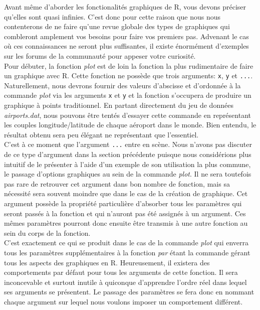 Avant même d'aborder les fonctionalités graphiques de R, vous devons préciser qu'elles sont quasi infinies. C'est donc pour cette raison que nous nous contenterons de ne faire qu'une revue globale des types de graphiques qui combleront amplement vos besoins pour faire vos premiers pas. Advenant le cas où ces connaissances ne seront plus suffisantes, il existe énormément d'exemples sur les forums de la communauté pour appeser votre curiosité. \\

\noindent
Pour débuter, la fonction \emph{plot} est de loin la fonction la plus rudimentaire de faire un graphique avec R. Cette fonction ne possède que trois arguments: \texttt{x}, \texttt{y} et \texttt{...}. Naturellement, nous devrons fournir des valeurs d'abscisse et d'ordonnée à la commande \emph{plot} via les arguments \texttt{x} et \texttt{y} et la fonction s'occupera de produire un graphique à points traditionnel. En partant directement du jeu de données \emph{airports.dat}, nous pouvons être tentés d'essayer cette commande en représentant les couples longitude/latitude de chaque aéroport dans le monde. Bien entendu, le résultat obtenu sera peu élégant ne représentant que l'essentiel. \\

\noindent
C'est à ce moment que l'argument \texttt{...} entre en scène. Nous n'avons pas discuter de ce type d'argument dans la section précédente puisque nous considérions plus intuitif de le présenter à l'aide d'un exemple de son utilisation la plus commune, le passage d'options graphiques au sein de la commande \emph{plot}. Il ne sera toutefois pas rare de retrouver cet argument dans bon nombre de fonction, mais sa nécessité sera souvent moindre que dans le cas de la création de graphique. Cet argument possède la propriété particulière d'absorber tous les paramètres qui seront passés à la fonction et qui n'auront pas été assignés à un argument. Ces mêmes paramètres pourront donc ensuite être transmis à une autre fonction au sein du corps de la fonction. \\

\noindent
C'est exactement ce qui se produit dans le cas de la commande \emph{plot} qui enverra tous les paramètres supplémentaires à la fonction \emph{par} étant la commande gérant tous les aspects des graphiques en R. Heureusement, il existera des comportements par défaut pour tous les arguments de cette fonction. Il sera inconcevable et surtout inutile à quiconque d'apprendre l'ordre réel dans lequel ses arguments se présentent. Le passage des paramètres se fera donc en nommant chaque argument sur lequel nous voulons imposer un comportement différent. \\

